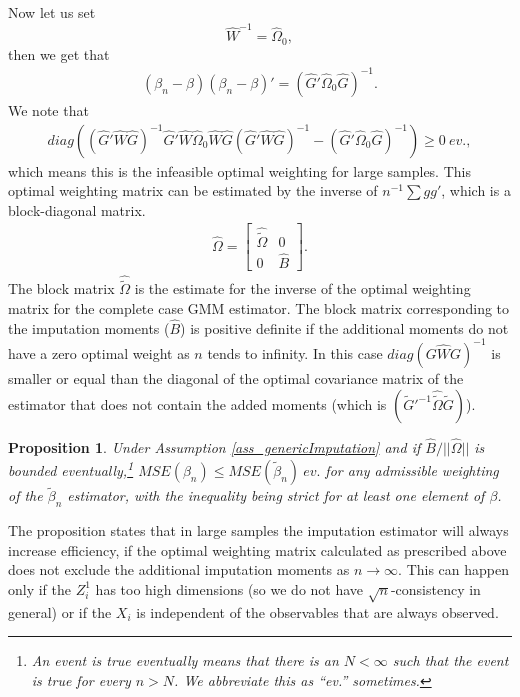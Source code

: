 \documentclass{article}
\newtheorem{proposition}{Proposition}
\theoremstyle{definition}
\theoremstyle{remark}
\begin{document}
Now let us set
\[\hat{W}^{-1}=\hat{\Omega}_0,
\]
then we get that
\begin{align}
(\beta_n -\beta)(\beta_n -\beta)'= \left(\hat{G}'\hat{\Omega}_0 \hat{G}\right)^{-1}.
\end{align}
We note that
\begin{align*}
diag\left((\hat{G}'\hat{W}\hat{G})^{-1} \hat{G}'\hat{W} \hat{\Omega}_0 \hat{W} \hat{G} (\hat{G}'\hat{W}\hat{G})^{-1}-  (\hat{G}'\hat{\Omega}_0 \hat{G})^{-1}\right)\geq 0 \ ev.,
\end{align*}
which means this is the infeasible optimal weighting for large samples. This optimal weighting matrix can be estimated by the inverse of $n^{-1}\sum g g'$, which is a block-diagonal matrix.
\begin{align}
\hat{\Omega} = \left[\begin{array}{cc}
\hat{\tilde{\Omega}} & 0 \\ 0 & \hat{B}
\end{array}\right].
\end{align}
The block matrix $\hat{\tilde{\Omega}}$ is the estimate for the inverse of the optimal weighting matrix for the complete case GMM estimator. The block matrix corresponding to the imputation moments ($\hat{B}$) is positive definite if the additional moments do not have a zero optimal weight as $n$ tends to infinity. In this case $diag(G\hat{W}G)^{-1}$ is smaller or equal than the diagonal of the optimal covariance matrix of the estimator that does not contain the added moments (which is $(\tilde{G}'^{-1}\hat{\tilde{\Omega}} \tilde{G})$).
\begin{proposition}
	Under Assumption \ref{ass_genericImputation} and if $\hat{B}/||\hat{\Omega}||$ is bounded eventually,\footnote{An event is true eventually means that there is an $N<\infty$ such that the event is true for every $n>N$. We abbreviate this as ``ev.'' sometimes.} $MSE(\beta_n)\leq MSE(\tilde{\beta}_n) \ ev.$ for any admissible weighting of the $\tilde{\beta}_n$ estimator, with the inequality being strict for at least one element of $\beta$.
\end{proposition}
The proposition states that in large samples the imputation estimator will always increase efficiency, if the optimal weighting matrix calculated as prescribed above does not exclude the additional imputation moments as $n\rightarrow \infty$. This can happen only if the $Z_i^1$ has too high dimensions (so we do not have $\sqrt{n}$-consistency in general) or if the $X_i$ is independent of the observables that are always observed.
\end{document}
